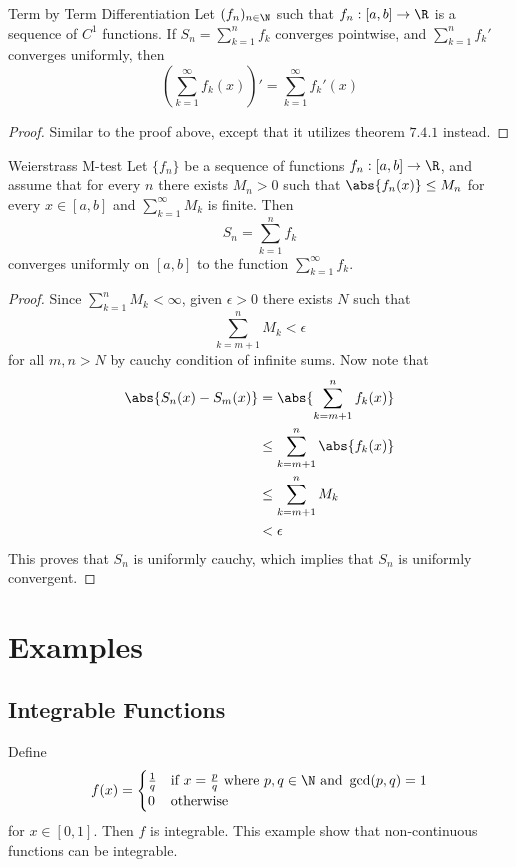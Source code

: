 \begin{thm}{Term by Term Differentiation}{} Let $(f_n)_{n\in\N}$ such that $f_n:[a,b]\to\R$ is a sequence of $C^1$ functions. If $S_n=\sum_{k=1}^nf_k$ converges pointwise, and $\sum_{k=1}^nf_k'$ converges uniformly, then $$\left(\sum_{k=1}^\infty f_k(x)\right)'=\sum_{k=1}^\infty f_k'(x)$$ \tcbline
\begin{proof} Similar to the proof above, except that it utilizes theorem $7.4.1$ instead. 
\end{proof}
\end{thm}

\begin{thm}{Weierstrass M-test}{} Let $\{f_n\}$ be a sequence of functions $f_n:[a,b]\to\R$, and assume that for every $n$ there exists $M_n>0$ such that $\abs{f_n(x)}\leq M_n$ for every $x\in[a,b]$ and $\sum_{k=1}^\infty M_k$ is finite. Then $$S_n=\sum_{k=1}^n f_k$$ converges uniformly on $[a,b]$ to the function $\sum_{k=1}^\infty f_k$. \tcbline
\begin{proof}
Since $\sum_{k=1}^nM_k<\infty$, given $\epsilon>0$ there exists $N$ such that $$\sum_{k=m+1}^nM_k<\epsilon$$ for all $m,n>N$ by cauchy condition of infinite sums. Now note that
\begin{align*}
\abs{S_n(x)-S_m(x)}&=\abs{\sum_{k=m+1}^nf_k(x)}\\
&\leq\sum_{k=m+1}^n\abs{f_k(x)}\\
&\leq\sum_{k=m+1}^nM_k\\
&<\epsilon
\end{align*}
This proves that $S_n$ is uniformly cauchy, which implies that $S_n$ is uniformly convergent. 
\end{proof}
\end{thm}

\pagebreak
\section{Examples}
\subsection{Integrable Functions}
\begin{eg}{}{} Define $$f(x)=\begin{cases}
\frac{1}{q} & \text{if } x=\frac{p}{q} \text{ where } p,q\in\N \text{ and } \gcd(p,q)=1\\
0 & \text{otherwise }
\end{cases}$$ for $x\in[0,1]$. Then $f$ is integrable. This example show that non-continuous functions can be integrable. 
\end{eg}

